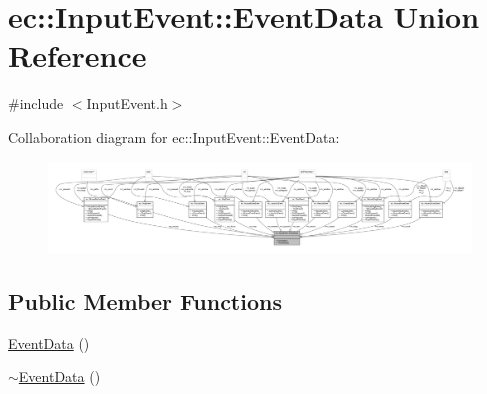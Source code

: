 \hypertarget{unionec_1_1_input_event_1_1_event_data}{}\section{ec\+:\+:Input\+Event\+:\+:Event\+Data Union Reference}
\label{unionec_1_1_input_event_1_1_event_data}


{\ttfamily \#include $<$Input\+Event.\+h$>$}



Collaboration diagram for ec\+:\+:Input\+Event\+:\+:Event\+Data\+:\nopagebreak
\begin{figure}[H]
\begin{center}
\leavevmode
\includegraphics[width=350pt]{unionec_1_1_input_event_1_1_event_data__coll__graph}
\end{center}
\end{figure}
\subsection*{Public Member Functions}
\begin{DoxyCompactItemize}
\item 
\mbox{\hyperlink{unionec_1_1_input_event_1_1_event_data_a07feefe51335e0521a10f2032d5a7dbc}{Event\+Data}} ()
\item 
\mbox{\hyperlink{unionec_1_1_input_event_1_1_event_data_aa5609c794c2f689ecea99efa7c1a16b0}{$\sim$\+Event\+Data}} ()
\end{DoxyCompactItemize}
